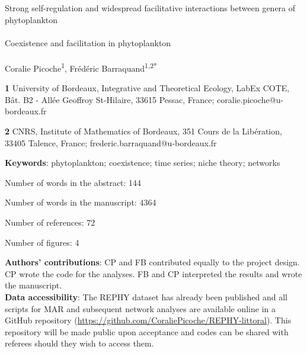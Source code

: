 \documentclass[10pt]{article}
\begin{document}
\thispagestyle{empty}
\vspace*{0.2in}


{\Large{}{Strong self-regulation and widespread facilitative interactions
between genera of phytoplankton} %
} \\
\bigskip{}
\textbf{\large{}}\\
{\large{}{Coexistence and facilitation in phytoplankton} %
} %
\\
\\
 \bigskip{}
Coralie Picoche\textsuperscript{1}, Frédéric Barraquand\textsuperscript{1,2{*}}
\\
 \bigskip{}

\textbf{1} University of Bordeaux, Integrative and Theoretical Ecology,
LabEx COTE, Bât. B2 - Allée Geoffroy St-Hilaire, 33615 Pessac, France;
coralie.picoche@u-bordeaux.fr

\textbf{2} CNRS, Institute of Mathematics of Bordeaux, 351 Cours de
la Libération, 33405 Talence, France; frederic.barraquand@u-bordeaux.fr
\\

\bigskip{}

\textbf{Keywords}: phytoplankton; coexistence; time series; niche
theory; networks

\bigskip{}
Number of words in the abstract: 144

Number of words in the manuscript: 4364

Number of references: 72

Number of figures: 4 \bigskip{}

\textbf{Authors' contributions}: CP and FB contributed equally to
the project design. CP wrote the code for the analyses. FB and CP
interpreted the results and wrote the manuscript.\\

\textbf{Data accessibility}: The REPHY dataset has already been published
\citep{REPHY_db} and all scripts for MAR and subsequent network analyses
are available online in a GitHub repository (\url{https://github.com/CoraliePicoche/REPHY-littoral}).
This repository will be made public upon acceptance and codes can
be shared with referees should they wish to access them.
\end{document}
